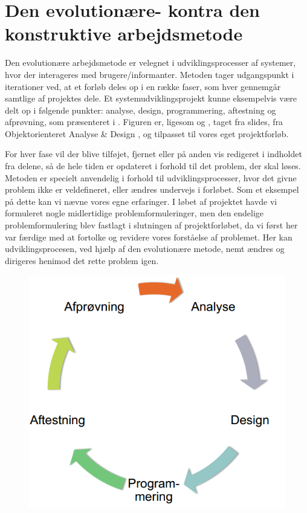 \section{Den evolutionære- kontra den konstruktive arbejdsmetode}

Den evolutionære arbejdsmetode er velegnet i udviklingsprocesser af systemer, hvor der interageres med brugere/informanter. 
Metoden tager udgangspunkt i iterationer ved, at et forløb deles op i en række faser, som hver gennemgår samtlige af projektes dele. 
Et systemudviklingsprojekt kunne eksempelvis være delt op i følgende punkter: analyse, design, programmering, aftestning og afprøvning, som præsenteret i . Figuren er, ligesom  og , taget fra slides, fra Objektorienteret Analyse \& Design \cite{ooadslide}, og tilpasset til vores eget projektforløb.

For hver fase vil der blive tilføjet, fjernet eller på anden vis redigeret i indholdet fra delene, så de hele tiden er opdateret i forhold til det problem, der skal løses. 
Metoden er specielt anvendelig i forhold til udviklingsprocesser, hvor det givne problem ikke er veldefineret, eller ændres undervejs i forløbet. 
Som et eksempel på dette kan vi nævne vores egne erfaringer. I løbet af projektet havde vi formuleret nogle midlertidige problemformuleringer, men den endelige problemformulering blev fastlagt i slutningen af projektforløbet, da vi først her var færdige med at fortolke og revidere vores forståelse af problemet.
Her kan udviklingsprocesen, ved hjælp af den evolutionære metode, nemt ændres og dirigeres henimod det rette problem igen.

\begin{figure}[ht]
	\centering
	\includegraphics[scale=0.5]{billeder/evolutionaeremetode.png}
	\label{fig:evolutionaeremetode}
  \end{figure}

